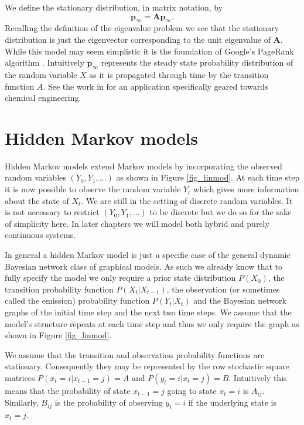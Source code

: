 We define the stationary distribution, in matrix notation, by \begin{equation}
\mathbf{p}_{\infty} = \mathbf{A}\mathbf{p}_{\infty}.
\label{eq_markov_chain_stationary}
\end{equation}
Recalling the definition of the eigenvalue problem we see that the stationary distribution is just the eigenvector corresponding to the unit eigenvalue of $\mathbf{A}$. While this model may seem simplistic it is the foundation of Google's PageRank algorithm \cite{google}.  Intuitively $\mathbf{p}_\infty$ represents the steady state probability distribution of the random variable $X$ as it is propagated through time by the transition function $A$. See the work in \cite{streicher} for an application specifically geared towards chemical engineering.

\section{Hidden Markov models}
Hidden Markov models extend Markov models by incorporating the observed random variables $(Y_0, Y_1,\hdots)$ as shown in Figure \ref{fig_linmod}. At each time step it is now possible to observe the random variable $Y_t$ which gives more information about the state of $X_t$. We are still in the setting of discrete random variables. It is not necessary to restrict $(Y_0, Y_1,\hdots)$ to be discrete but we do so for the sake of simplicity here. In later chapters we will model both hybrid and purely continuous systems. 

In general a hidden Markov model is just a specific case of the general dynamic Bayesian network class of graphical models. As such we already know that to fully specify the model we only require a prior state distribution $P(X_0)$, the transition probability function $P(X_t|X_{t-1})$, the observation (or sometimes called the emission) probability function $P(Y_t|X_t)$ and the Bayesian network graphs of the initial time step and the next two time steps. We assume that the model's structure repeats at each time step and thus we only require the graph as shown in Figure \ref{fig_linmod}.

We assume that the transition and observation probability functions are stationary. Consequently they may be represented by the row stochastic square matrices $P(x_t=i|x_{t-1}=j) = A$ and $P(y_t=i|x_t=j) = B$. Intuitively this means that the probability of state $x_{t-1}=j$ going to state $x_{t} = i$ is $A_{ij}$. Similarly, $B_{ij}$ is the probability of observing $y_t=i$ if the underlying state is $x_t=j$.

